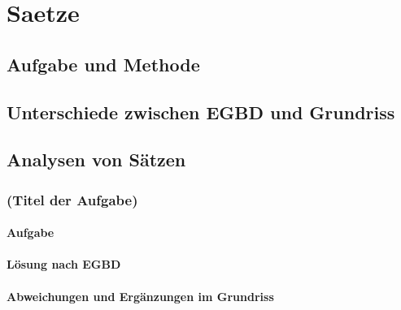 \chapter{Saetze}
\label{sec:saetze}

\section{Aufgabe und Methode}
\label{sec:saetze:aufgabeundmethoden}

\section{Unterschiede zwischen EGBD und Grundriss}
\label{sec:saetze:unterschiedezwischenegbdundgrundriss}

\section{Analysen von Sätzen}
\label{sec:saetze:analysenvonsaetzen}

\subsection{(Titel der Aufgabe)}

\subsubsection{Aufgabe}

\subsubsection{Lösung nach EGBD}

\subsubsection{Abweichungen und Ergänzungen im Grundriss}


